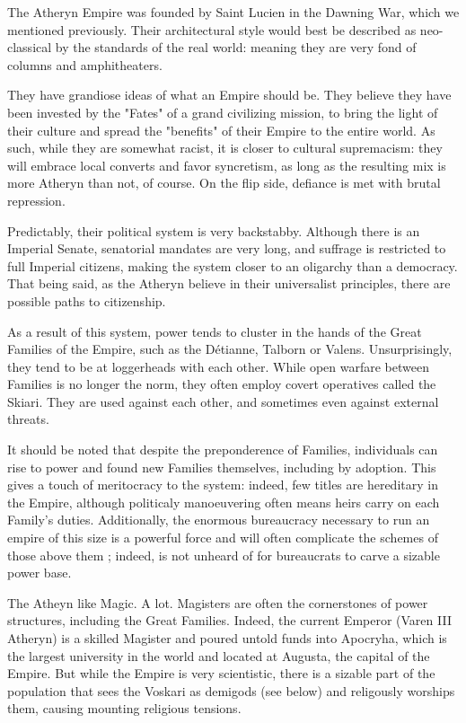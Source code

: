 The Atheryn Empire was founded by Saint Lucien in the Dawning War, which we mentioned previously. Their architectural style would best be described as neo-classical by the standards of the real world: meaning they are very fond of columns and amphitheaters.

They have grandiose ideas of what an Empire should be. They believe they have been invested by the "Fates" of a grand civilizing mission, to bring the light of their culture and spread the "benefits" of their Empire to the entire world. As such, while they are somewhat racist, it is closer to cultural supremacism: they will embrace local converts and favor syncretism, as long as the resulting mix is more Atheryn than not, of course. On the flip side, defiance is met with brutal repression. 

Predictably, their political system is very backstabby. Although there is an Imperial Senate, senatorial mandates are very long, and suffrage is restricted to full Imperial citizens, making the system closer to an oligarchy than a democracy. That being said, as the Atheryn believe in their universalist principles, there are possible paths to citizenship.

As a result of this system, power tends to cluster in the hands of the Great Families of the Empire, such as the Détianne, Talborn or Valens. Unsurprisingly, they tend to be at loggerheads with each other. While open warfare between Families is no longer the norm, they often employ covert operatives called the Skiari. They are used against each other, and sometimes even against external threats.

It should be noted that despite the preponderence of Families, individuals can rise to power and found new Families themselves, including by adoption. This gives a touch of meritocracy to the system: indeed, few titles are hereditary in the Empire, although politicaly manoeuvering often means heirs carry on each Family's duties. Additionally, the enormous bureaucracy necessary to run an empire of this size is a powerful force and will often complicate the schemes of those above them ; indeed, is not unheard of for bureaucrats to carve a sizable power base.

The Atheyn like Magic. A lot. Magisters are often the cornerstones of power structures, including the Great Families. Indeed, the current Emperor (Varen III Atheryn) is a skilled Magister and poured untold funds into Apocryha, which is the largest university in the world and located at Augusta, the capital of the Empire. But while the Empire is very scientistic, there is a sizable part of the population that sees the Voskari as demigods (see below) and religously worships them, causing mounting religious tensions.

